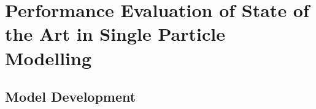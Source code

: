 

\graphicspath{{chapters/spm_analysis/figures/}}

\clearpage
\chapter{Performance Evaluation of State of the Art in Single Particle Modelling}\label{ch:spmanalysis}
\startcontents[chapters]

\bigskip


% 

\section{ Model Development}\label{sec:spmmodeldevelopment}







